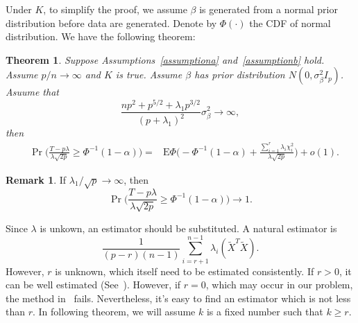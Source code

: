 \documentclass[review]{elsarticle}
\theoremstyle{plain}
\newtheorem{theorem}{\quad\quad Theorem}
\theoremstyle{definition}
\newtheorem{remark}{\quad\quad Remark}
\theoremstyle{remark}
\begin{document}
Under $K$, to simplify the proof, we assume $\beta$ is generated from a normal prior distribution before data are generated. Denote by $\Phi(\cdot)$ the CDF of normal distribution. We have the following theorem:
\begin{theorem}\label{theoremc}
   Suppose Assumptions~\ref{assumptiona} and~\ref{assumptionb} hold.
    Assume $p/n \to  \infty$ and $K$ is true. Assume $\beta$ has prior distribution $N(0,\sigma_\beta^2 I_p)$. Asuume that
\begin{equation*}
    \frac{np^2+p^{5/2}+\lambda_1 p^{3/2}}{{(p+\lambda_1)}^2}\sigma^2_{\beta}\to \infty,
\end{equation*}
then
\begin{equation*}
    \begin{aligned}
        &\Pr\Big(\frac{T-p\lambda}{\lambda\sqrt{2p}}\geq \Phi^{-1}(1-\alpha)\Big)
        =& \textrm{E}\Phi\Big( -\Phi^{-1}(1-\alpha) +\frac{\sum_{i=1}^r \lambda_i \chi^2_i}{\lambda\sqrt{2p}} \Big)+o(1).
    \end{aligned}
\end{equation*}
\end{theorem}
\begin{remark}
    If $\lambda_1/\sqrt{p}\to \infty$, then 
\begin{equation*} 
    \Pr\Big(\frac{T-p\lambda}{\lambda\sqrt{2p}}\geq \Phi^{-1}(1-\alpha)\Big)\to 1.
\end{equation*}
\end{remark}

Since $\lambda$ is unkown, an estimator should be substituted. A natural estimator is
\begin{equation*}
    \frac{1}{(p-r)(n-1)}\sum_{i=r+1}^{n-1}\lambda_{i}(\tilde{X}^T\tilde{X}).
\end{equation*}
However, $r$ is unknown, which itself need to be estimated consistently. If $r>0$, it can be well estimated (See~\cite{Ahn2009Eigenvalue}). However, if $r=0$, which may occur in our problem, the method in~\cite{Ahn2009Eigenvalue} fails. Nevertheless, it's easy to find an estimator which is not less than $r$.
In following theorem, we will assume $k$ is a fixed number such that $k\geq r$.
 
\end{document}
